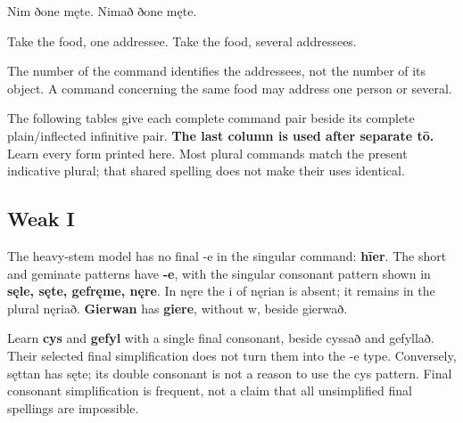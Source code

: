 Nim ðone męte. Nimað ðone męte.

Take the food, one addressee. Take the food, several addressees.

The number of the command identifies the addressees, not the number of its object. A command concerning the same food may address one person or several.

The following tables give each complete command pair beside its complete plain/\allowbreak{}inflected infinitive pair. \textbf{The last column is used after separate tō.} Learn every form printed here. Most plural commands match the present indicative plural; that shared spelling does not make their uses identical.

\subsection*{Weak I}

The heavy-stem model has no final -e in the singular command: \textbf{hīer}. The short and geminate patterns have \textbf{-e}, with the singular consonant pattern shown in \textbf{sęle, sęte, gefręme, nęre}. In nęre the i of nęrian is absent; it remains in the plural nęriað. \textbf{Gierwan} has \textbf{giere}, without w, beside gierwað.

Learn \textbf{cys} and \textbf{gefyl} with a single final consonant, beside cyssað and gefyllað. Their selected final simplification does not turn them into the -e type. Conversely, sęttan has sęte; its double consonant is not a reason to use the cys pattern. Final consonant simplification is frequent, not a claim that all unsimplified final spellings are impossible.

